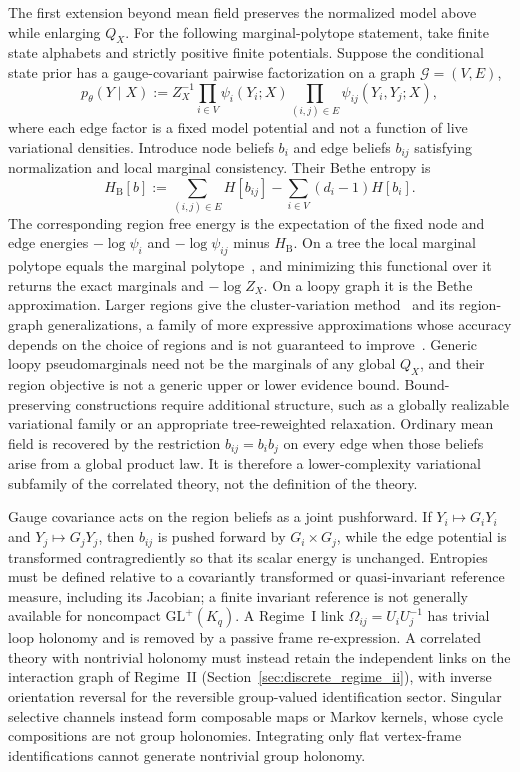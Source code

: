 The first extension beyond mean field preserves the normalized model above while enlarging $Q_X$. For the following marginal-polytope statement, take finite state alphabets and strictly positive finite potentials. Suppose the conditional state prior has a gauge-covariant pairwise factorization on a graph $\mathcal{G}=(V,E)$,
\begin{equation}
p_\theta(Y\mid X)
:=Z_X^{-1}
\prod_{i\in V}\psi_i(Y_i;X)
\prod_{(i,j)\in E}\psi_{ij}(Y_i,Y_j;X),
\label{eq:beyond_mf_pairwise_joint}
\end{equation}
where each edge factor is a fixed model potential and not a function of live variational densities. Introduce node beliefs $b_i$ and edge beliefs $b_{ij}$ satisfying normalization and local marginal consistency. Their Bethe entropy is
\begin{equation}
H_{\mathrm{B}}[b]
:=\sum_{(i,j)\in E}H[b_{ij}]
-\sum_{i\in V}(d_i-1)H[b_i].
\label{eq:beyond_mf_bethe_entropy}
\end{equation}
The corresponding region free energy is the expectation of the fixed node and edge energies $-\log\psi_i$ and $-\log\psi_{ij}$ minus $H_{\mathrm{B}}$. On a tree the local marginal polytope equals the marginal polytope~\cite[Prop.~4.1]{Wainwright2008}, and minimizing this functional over it returns the exact marginals and $-\log Z_X$. On a loopy graph it is the Bethe approximation. Larger regions give the cluster-variation method~\cite{Kikuchi1951} and its region-graph generalizations, a family of more expressive approximations whose accuracy depends on the choice of regions and is not guaranteed to improve~\cite[Sec.~VIII.C]{Yedidia2005}. Generic loopy pseudomarginals need not be the marginals of any global $Q_X$, and their region objective is not a generic upper or lower evidence bound. Bound-preserving constructions require additional structure, such as a globally realizable variational family or an appropriate tree-reweighted relaxation. Ordinary mean field is recovered by the restriction $b_{ij}=b_i b_j$ on every edge when those beliefs arise from a global product law. It is therefore a lower-complexity variational subfamily of the correlated theory, not the definition of the theory.

Gauge covariance acts on the region beliefs as a joint pushforward. If $Y_i\mapsto G_iY_i$ and $Y_j\mapsto G_jY_j$, then $b_{ij}$ is pushed forward by $G_i\times G_j$, while the edge potential is transformed contragrediently so that its scalar energy is unchanged. Entropies must be defined relative to a covariantly transformed or quasi-invariant reference measure, including its Jacobian; a finite invariant reference is not generally available for noncompact $\mathrm{GL}^+(K_q)$. A Regime~I link $\Omega_{ij}=U_iU_j^{-1}$ has trivial loop holonomy and is removed by a passive frame re-expression. A correlated theory with nontrivial holonomy must instead retain the independent links on the interaction graph of Regime~II (Section~\ref{sec:discrete_regime_ii}), with inverse orientation reversal for the reversible group-valued identification sector. Singular selective channels instead form composable maps or Markov kernels, whose cycle compositions are not group holonomies. Integrating only flat vertex-frame identifications cannot generate nontrivial group holonomy.

